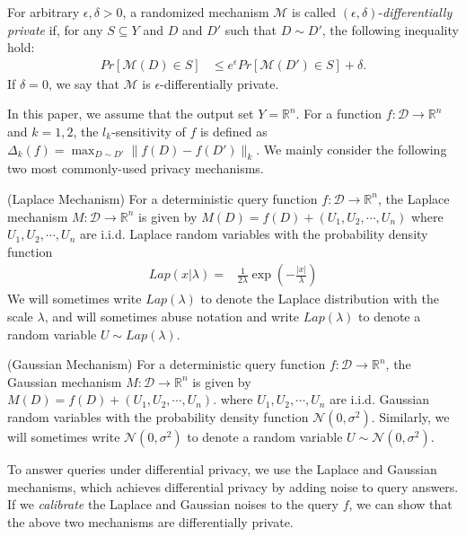 \documentclass[11pt]{article}
\begin{document}
	\begin{definition} For arbitrary $\epsilon, \delta >0$, a randomized mechanism $\mathcal{M}$ is called $(\epsilon,\delta)$-\emph{differentially private} if, for any $S\subseteq Y$ and $D$ and $D'$ such that $D\sim D'$, the following inequality hold:
		\begin{align}
		Pr[\mathcal{M}(D)\in S] & \leq e^{\epsilon}Pr[\mathcal{M}(D')\in S] +\delta. \nonumber
		\end{align}
		If $\delta=0$, we say that $\mathcal{M}$ is $\epsilon$-differentially private. 
	\end{definition}
	
	
	In this paper, we assume that the output set $Y = \mathbb{R}^n$.  For a function $f: \mathcal{D}\rightarrow \mathbb{R}^n$ and $k=1,2$, the $l_k$-sensitivity of $f$ is defined as
$\Delta_k(f) =  \max_{D \sim D'} \| f(D)-f(D')\|_k$. 
We mainly consider the following two most commonly-used privacy mechanisms.  

\begin{definition} (Laplace Mechanism) \label{def:Laplace} For a deterministic query function $f: \mathcal{D}\rightarrow \mathbb{R}^n$, the Laplace mechanism $M: \mathcal{D}\rightarrow \mathbb{R}^n$ is given by $
	M(D) =f(D) + (U_1, U_2, \cdots, U_n)$
where $U_1,U_2, \cdots, U_n$ are i.i.d. Laplace random variables with the probability density function 
\begin{align}
	Lap (x| \lambda) = & \frac{1}{2\lambda} \exp \left(- \frac{|x|}{\lambda}\right) \nonumber
\end{align}
We will sometimes write $Lap(\lambda)$ to denote the Laplace distribution with the scale $\lambda$, and will sometimes abuse notation and write $Lap(\lambda)$ to denote a random variable $U \sim Lap(\lambda)$. 
\end{definition}

\begin{definition} (Gaussian Mechanism) \label{def:Gaussian} For a deterministic query function $f: \mathcal{D}\rightarrow \mathbb{R}^n$, the Gaussian mechanism $M: \mathcal{D}\rightarrow \mathbb{R}^n$ is given by $M(D) =  f(D) + (U_1, U_2, \cdots, U_n)$.
where $U_1,U_2, \cdots, U_n$ are i.i.d. Gaussian random variables with the probability density function 
$\mathcal{N}(0, \sigma^2)$. Similarly, 
we will sometimes write $\mathcal{N}(0, \sigma^2)$ to denote a random variable $U \sim \mathcal{N}(0, \sigma^2)$. 
\end{definition}

To answer queries under differential privacy, we use the
Laplace and Gaussian mechanisms, which achieves differential privacy
by adding noise to query answers. 
If we \emph{calibrate} the Laplace and Gaussian noises to the query $f$, we can show that the above two mechanisms are  differentially private. 
\end{document}
